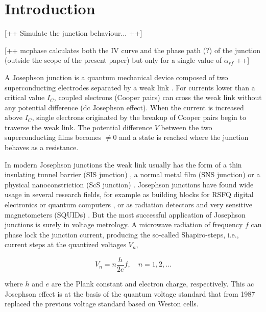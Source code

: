 \section{Introduction}


[++ Simulate the junction behaviour... ++]

[++ mcphase calculates both the IV curve and the phase path (?) of the junction (outside the scope of the present paper) but only for a single value of $\alpha_{rf}$   ++]

A Josephson junction is a quantum mechanical device composed of two superconducting electrodes separated by a weak link \cite{Barone:1982}.
For currents lower than a critical value $I_C$, coupled electrons (Cooper pairs) can cross the weak link without any potential difference (dc Josephson effect).
When the current is increased above $I_C$, single electrons originated by the breakup of Cooper pairs begin to traverse the weak link. The potential difference $V$ between the two superconducting films becomes $\neq 0$ and a state is reached where the junction behaves as a resistance.

In modern Josephson junctions the weak link usually has the form of a thin insulating tunnel barrier (SIS junction) \cite{Gurvitch:1983}, a normal metal film (SNS junction) \cite{Benz:1995} or a physical nanoconstriction (ScS junction) \cite{Cybart:2015, DeLeo:2016}. Josephson junctions have found wide usage in several research fields, for example as building blocks for RSFQ digital electronics  or quantum computers \cite{Likharev:1991}, or as radiation detectors and very sensitive magnetometers (SQUIDs) \cite{Maggi:2006b, Granata:2015}.
But the most successful application of Josephson junctions is surely in voltage metrology.
A microwave radiation of frequency $f$ can phase lock the junction current, producing the so-called Shapiro-steps, i.e., current steps at the quantized voltages $V_n$, 

\begin{equation}
	V_n = n \frac{h}{2 e} f, \quad n = 1, 2, ...
\label{eq:voltage_steps}
\end{equation}

where $h$ and $e$ are the Plank constant and electron charge, respectively. This ac Josephson effect is at the basis of the quantum voltage standard that from 1987 replaced the previous voltage standard based on Weston cells.

